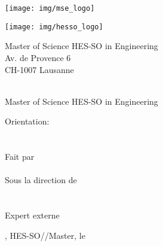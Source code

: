 
\begin{titlepage}
{\selectfont
	\begin{flushright}
		\begin{minipage}{0.5\textwidth}
			\begin{flushleft}
				\texttt{[image: img/mse\_logo]}
			\end{flushleft}
		\end{minipage}%
		\begin{minipage}{0.5\textwidth}
			\begin{flushright}
				\texttt{[image: img/hesso\_logo]}
			\end{flushright}
		\end{minipage}
		\begin{flushleft}
			\footnotesize
			Master of Science HES-SO in Engineering \\
			Av. de Provence 6 \\
			CH-1007 Lausanne
		\end{flushleft}
		~\\[0.5cm]

		{
		\Huge Master of Science HES-SO in Engineering\\[0.5cm]
		}

		{
		\LARGE Orientation: \Orientation\\[0.5cm]
		~\\[1cm]
		}
		{
			\Huge
			\ThesisTitle \\[1.5cm]
		}
		{
			\large
			Fait par\\[-0.3cm]
			\Huge \Author \\[0.8cm]
		}
		{
			\large
			Sous la direction de \\
			\Advisor \\
			\AdvisorResearchUnit \\[0.5cm]
		}
		{
			\large
			Expert externe
			\Expert \\
			\ExpertLab
		}
		\vfill

		{\large \Place, HES-SO//Master, le \Date}

	\end{flushright}
}
\restoregeometry
\end{titlepage}
